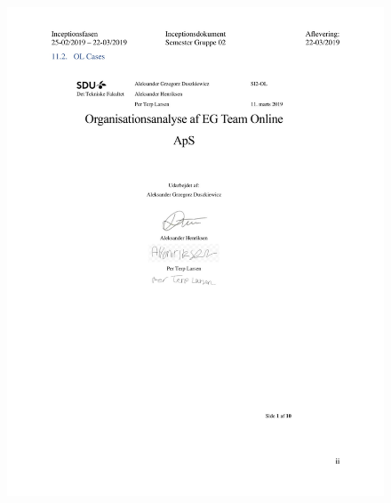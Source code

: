 \begin{figure}[hb]
  \includegraphics[scale = 0.33]{./PNG/Inceptions/Gruppe 02 + InceptionsDokument-35.jpg} 
\end{figure}

